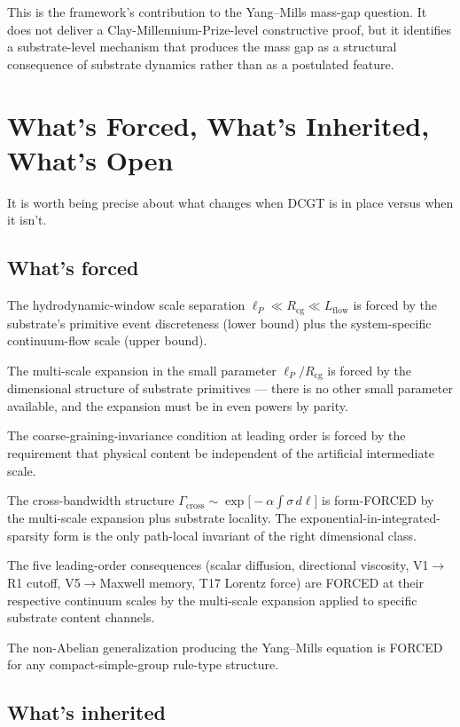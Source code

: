 \documentclass[11pt,a4paper]{article}
\begin{document}
This is the framework's contribution to the Yang--Mills mass-gap question. It does not deliver a Clay-Millennium-Prize-level constructive proof, but it identifies a substrate-level mechanism that produces the mass gap as a structural consequence of substrate dynamics rather than as a postulated feature.

\section{What's Forced, What's Inherited, What's Open}

It is worth being precise about what changes when DCGT is in place versus when it isn't.

\subsection{What's forced}

The hydrodynamic-window scale separation $\ell_P \ll R_{\mathrm{cg}} \ll L_{\mathrm{flow}}$ is forced by the substrate's primitive event discreteness (lower bound) plus the system-specific continuum-flow scale (upper bound).

The multi-scale expansion in the small parameter $\ell_P/R_{\mathrm{cg}}$ is forced by the dimensional structure of substrate primitives --- there is no other small parameter available, and the expansion must be in even powers by parity.

The coarse-graining-invariance condition at leading order is forced by the requirement that physical content be independent of the artificial intermediate scale.

The cross-bandwidth structure $\Gamma_{\mathrm{cross}} \sim \exp\bigl[-\alpha \int \sigma\, d\ell\bigr]$ is form-FORCED by the multi-scale expansion plus substrate locality. The exponential-in-integrated-sparsity form is the only path-local invariant of the right dimensional class.

The five leading-order consequences (scalar diffusion, directional viscosity, V1$\to$R1 cutoff, V5$\to$Maxwell memory, T17 Lorentz force) are FORCED at their respective continuum scales by the multi-scale expansion applied to specific substrate content channels.

The non-Abelian generalization producing the Yang--Mills equation is FORCED for any compact-simple-group rule-type structure.

\subsection{What's inherited}
\end{document}
